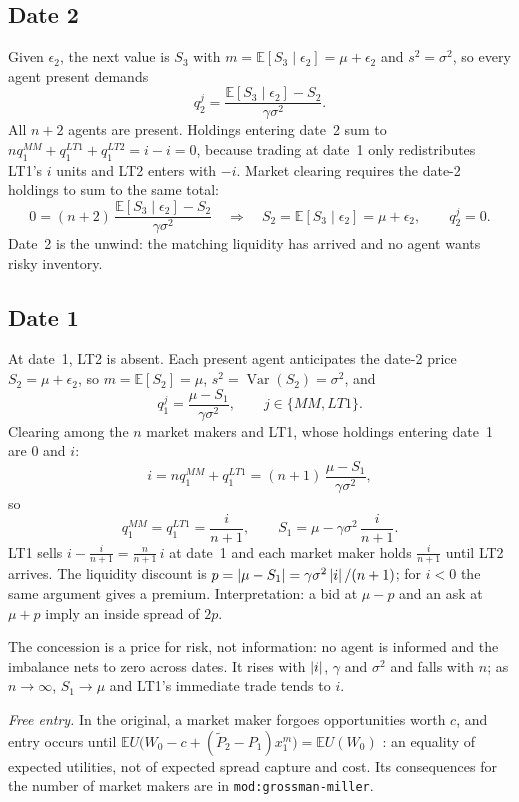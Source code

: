 \documentclass[a4paper,oneside,openany]{book}
\begin{document}
\subsection*{Date 2}
Given $\epsilon_2$, the next value is $S_3$ with $m=\mathbb{E}[S_3\mid\epsilon_2]=\mu+\epsilon_2$ and $s^2=\sigma^2$, so every agent present demands
\[ q_2^{j}=\frac{\mathbb{E}[S_3\mid\epsilon_2]-S_2}{\gamma\sigma^2}. \]
All $n+2$ agents are present. Holdings entering date~2 sum to $nq_1^{MM}+q_1^{LT1}+q_1^{LT2}=i-i=0$, because trading at date~1 only redistributes LT1's $i$ units and LT2 enters with $-i$. Market clearing requires the date-2 holdings to sum to the same total:
\[ 0=(n+2)\,\frac{\mathbb{E}[S_3\mid\epsilon_2]-S_2}{\gamma\sigma^2}
\quad\Longrightarrow\quad S_2=\mathbb{E}[S_3\mid\epsilon_2]=\mu+\epsilon_2,\qquad q_2^j=0. \]
Date~2 is the unwind: the matching liquidity has arrived and no agent wants risky inventory.

\subsection*{Date 1}
At date~1, LT2 is absent. Each present agent anticipates the date-2 price $S_2=\mu+\epsilon_2$, so $m=\mathbb{E}[S_2]=\mu$, $s^2=\operatorname{Var}(S_2)=\sigma^2$, and
\[ q_1^{j}=\frac{\mu-S_1}{\gamma\sigma^2},\qquad j\in\{MM,LT1\}. \]
Clearing among the $n$ market makers and LT1, whose holdings entering date~1 are $0$ and $i$:
\[ i=nq_1^{MM}+q_1^{LT1}=(n+1)\,\frac{\mu-S_1}{\gamma\sigma^2}, \]
so
\[ q_1^{MM}=q_1^{LT1}=\frac{i}{n+1},\qquad S_1=\mu-\gamma\sigma^2\,\frac{i}{n+1}. \]
LT1 sells $i-\frac{i}{n+1}=\frac{n}{n+1}\,i$ at date~1 and each market maker holds $\frac{i}{n+1}$ until LT2 arrives. The liquidity discount is $p=\left\lvert\mu-S_1\right\rvert=\gamma\sigma^2\left\lvert i\right\rvert/(n+1)$; for $i<0$ the same argument gives a premium. Interpretation: a bid at $\mu-p$ and an ask at $\mu+p$ imply an inside spread of $2p$.

The concession is a price for risk, not information: no agent is informed and the imbalance nets to zero across dates. It rises with $\left\lvert i\right\rvert$, $\gamma$ and $\sigma^2$ and falls with $n$; as $n\to\infty$, $S_1\to\mu$ and LT1's immediate trade tends to $i$.

\emph{Free entry.} In the original, a market maker forgoes opportunities worth $c$, and entry occurs until $\mathbb{E}U\big(W_0-c+(\tilde P_2-P_1)x_1^m\big)=\mathbb{E}U(W_0)$ \citep[eq.~(16), printed p.~18]{grossman-miller-1988-nber}: an equality of expected utilities, not of expected spread capture and cost. Its consequences for the number of market makers are in \texttt{mod:grossman-miller}.
\end{document}
